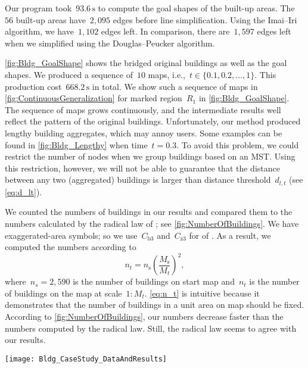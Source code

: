 Our program took~$93.6\,\mathrm{s}$ 
to compute the goal shapes of the built-up areas.
The~$56$ built-up areas have~$2{,}095$ edges before line 
simplification.
Using the Imai--Iri algorithm, we have~$1{,}102$ edges left.
In comparison, there are~$1{,}597$ edges left 
when we simplified using the Douglas--Peucker algorithm.

\fig\ref{fig:Bldg_GoalShape} shows 
the bridged original buildings as well as the goal shapes.
We produced a sequence of~$10$ maps,
i.e.,~$t \in \{0.1, 0.2, \dots, 1\}$.
This production cost~$668.2\,\mathrm{s}$ in total.
We show such a sequence of maps in 
\fig\ref{fig:ContinuousGeneralization} for 
marked region~$R_1$ in \fig\ref{fig:Bldg_GoalShape}.
The sequence of maps grows continuously, and 
the intermediate results well reflect 
the pattern of the original buildings.
%
Unfortunately, our method produced 
lengthy building aggregates, 
which may annoy users.
Some examples can be found in
\fig\ref{fig:Bldg_Lengthy} when time~$t=0.3$.
To avoid this problem, we could restrict the number of nodes
when we group buildings based on an MST.
Using this restriction, however, 
we will not be able to guarantee that 
the distance between any two (aggregated) buildings 
is larger than distance threshold~$d_{l,t}$
(see \eq\ref{eq:d_lt}).

We counted the numbers of buildings in our results
and compared them to the numbers calculated by
the radical law of \citet{Topfer1966}; 
see \fig\ref{fig:NumberOfBuildings}.
We have exaggerated-area symbols; 
so we use~$C_\mathrm{b3}$ and~$C_\mathrm{z3}$ 
for  of \citet{Topfer1966}.
As a result, we computed the numbers according to
\begin{equation}
\label{eq:n_t}
n_t=n_\mathrm{s}\left( \frac{M_\mathrm{s}}{M_t}\right) ^2,
\end{equation}
where~$n_s=2{,}590$ is the number of buildings on start map
and~$n_t$ is the number of buildings on the map at scale~$1:M_t$.
\eq\ref{eq:n_t} is intuitive because 
it demonstrates that the number of buildings in a 
unit area on map should be fixed.
According to \fig\ref{fig:NumberOfBuildings}, 
our numbers decrease faster than 
the numbers computed by the radical law.
Still, the radical law seems to agree with our results.


\begin{figure*}[tb]
\centering
\texttt{[image: Bldg\_CaseStudy\_DataAndResults]}
\caption{Bridged original buildings and
	goal shapes (darker polygons),
	without eliminating small buildings and holes, 
	where the goal shapes are for scale~$1:50{,}000$.
	There are~$56$ goal shapes, which have~$1{,}135$ 
	edges in total.
}
\label{fig:Bldg_GoalShape}
\end{figure*}



